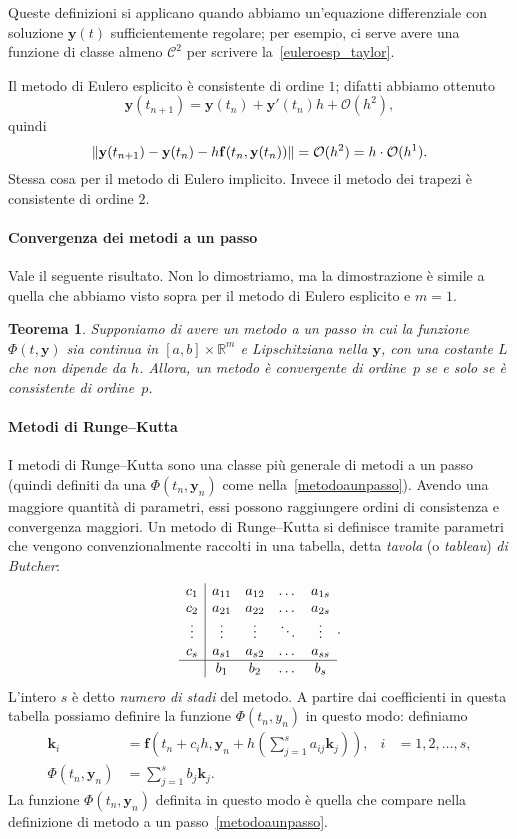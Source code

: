\documentclass[a4paper]{report}
\DeclarePairedDelimiter{\norm}{\lVert}{\rVert}
\newtheorem{theorem}{Teorema}[chapter]
\theoremstyle{definiton}
\theoremstyle{remark}
\newcommand{\y}{\mathbf{y}}
\newcommand{\f}{\mathbf{f}}
\begin{document}
Queste definizioni si applicano quando abbiamo un'equazione differenziale con soluzione $\y(t)$ sufficientemente regolare; per esempio, ci serve avere una funzione di classe almeno $\mathcal{C}^2$ per scrivere la~\eqref{euleroesp_taylor}.

Il metodo di Eulero esplicito è consistente di ordine $1$; difatti abbiamo ottenuto
\[
\y(t_{n+1}) = \y(t_n) + \y'(t_n)h + \mathcal{O}(h^2),
\]
quindi
\[
\norm*{\y(t_{n+1}) - \y(t_n) - h \f(t_n, \y(t_n))} = \mathcal{O}(h^2) = h \cdot \mathcal{O}(h^1).
\]
Stessa cosa per il metodo di Eulero implicito. Invece il metodo dei trapezi è consistente di ordine $2$.

\paragraph{Convergenza dei metodi a un passo}
Vale il seguente risultato. Non lo dimostriamo, ma la dimostrazione è simile a quella che abbiamo visto sopra per il metodo di Eulero esplicito e $m=1$.
\begin{theorem}
Supponiamo di avere un metodo a un passo in cui la funzione $\Phi(t,\y)$ sia continua in $[a,b] \times \mathbb{R}^m$ e Lipschitziana nella $\y$, con una costante $L$ che non dipende da $h$.
Allora, un metodo è convergente di ordine~$p$ se e solo se è consistente di ordine~$p$.
\end{theorem}


\paragraph{Metodi di Runge--Kutta} I metodi di Runge--Kutta sono una classe più generale di metodi a un passo (quindi definiti da una $\Phi(t_n,\y_n)$ come nella~\eqref{metodoaunpasso}). Avendo una maggiore quantità di parametri, essi possono raggiungere ordini di consistenza e convergenza maggiori. Un metodo di Runge--Kutta si definisce tramite parametri che vengono convenzionalmente raccolti in una tabella, detta \emph{tavola} (o \emph{tableau}) \emph{di Butcher}:
\[
\begin{array}{c|cccc}
c_1 & a_{11} & a_{12} & \dots & a_{1s}\\
c_2 & a_{21} & a_{22} & \dots & a_{2s}\\
\vdots & \vdots & \vdots & \ddots & \vdots\\
c_s & a_{s1} & a_{s2} & \dots & a_{ss}\\
\hline
& b_1 & b_2 & \dots & b_s
\end{array}.
\]
L'intero $s$ è detto \emph{numero di stadi} del metodo. A partire dai coefficienti in questa tabella possiamo definire la funzione $\Phi(t_n,y_n)$ in questo modo: definiamo
\begin{align*}
    \mathbf{k}_i &= \mathbf{f}\left(t_n + c_i h, \y_n + h\left(\sum_{j=1}^s a_{ij}\mathbf{k}_j\right)\right), & i&=1,2,\dots,s,\\
    \Phi(t_n, \mathbf{y}_n) &= \sum_{j=1}^s b_j \mathbf{k}_j.
\end{align*}
La funzione $\Phi(t_n, \mathbf{y}_n)$ definita in questo modo è quella che compare nella definizione di metodo a un passo~\eqref{metodoaunpasso}.
\end{document}
